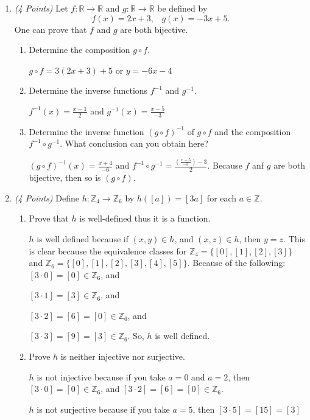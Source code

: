 \documentclass[10pt]{article} %
\newcommand{\Z}{\mathbb{Z}}
\newcommand{\R}{\mathbb{R}}
\newcommand{\points}[1]{{\it (#1 Points)}}
\begin{document}
\begin{enumerate}
 \item\points{4} Let $f:\R\to\R$ and $g:\R\to\R$ be defined by
 \begin{equation*}
    f(x)=2x+3, \;\;\; g(x)=-3x+5.
 \end{equation*}
 One can prove that $f$ and $g$ are both bijective.
 \begin{enumerate}
   \item Determine the composition $g \circ f$.
   
    $g \circ f=3(2x+3)+5$ or $y=-6x-4$
   \item Determine the inverse functions $f^{-1}$ and $g^{-1}$.
   
    $f^{-1}(x)=\frac{x-1}{2}$ and $g^{-1}(x)=\frac{x-5}{-3}$
   \item Determine  the inverse function $(g \circ f)^{-1}$ of $g \circ f$ and the composition $f^{-1} \circ g^{-1}$. What conclusion can you obtain here?
   
    $(g \circ f)^{-1}(x)=\frac{x+4}{-6}$ and $f^{-1} \circ g^{-1}=\frac{(\frac{x-5}{-3})-3}{2}$.  Because $f$ anf $g$ are both bijective, then so is $(g \circ f)$.  
 \end{enumerate}
 
 \item \points{4} Define  $h: \Z_{4}\to \Z_{6}$  by $h([a])=[3a]$ for each $a\in \Z$.
\begin{enumerate}
\item Prove that  $h$ is well-defined thus it is a function.

 $h$ is well defined because if $(x,y)\in h$, and $(x,z)\in h$, then $y=z$.  This is clear because the equivalence classes for $\Z_{4}=\{[0],[1],[2],[3]\}$ and $\Z_{6} = \{[0],[1],[2],[3],[4],[5]\}$.  Because of the following:
$[3 \cdot 0] = [0] \in \Z_{6}$, and

$[3 \cdot 1] = [3] \in \Z_{6}$, and

$[3 \cdot 2] = [6] = [0] \in \Z_{6}$, and

$[3 \cdot 3] = [9] = [3] \in \Z_{6}$.  So, $h$ is well defined.  
\item Prove $h$ is neither injective nor surjective. 

 $h$ is not injective because if you take $a=0$ and $a=2$, then $[3 \cdot 0] = [0] \in \Z_{6}$, and $[3 \cdot 2] = [6] = [0] \in \Z_{6}$.  

$h$ is not surjective because if you take $a=5$, then $[3 \cdot 5]=[15]=[3]$
\end{enumerate}
 

\end{enumerate}
\end{document}
